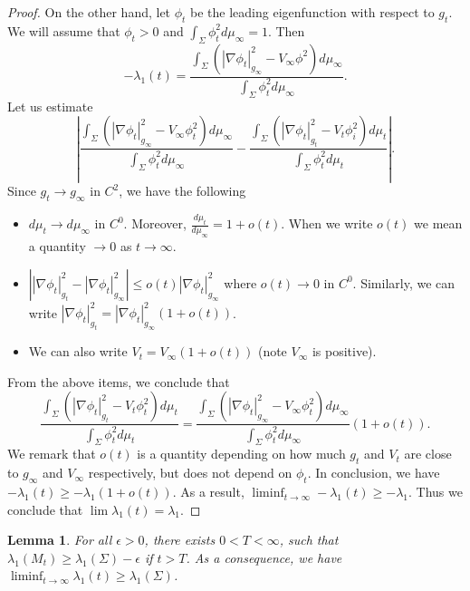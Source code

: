 \documentclass[12pt]{amsart}
\numberwithin{equation}{section}
\newtheorem{lemma}[theorem]{Lemma}
\numberwithin{equation}{section}
\begin{document}
\begin{proof}
		On the other hand, let $\phi_t$ be the leading eigenfunction with respect to $g_t$. We will assume that $\phi_t>0$ and $\int_\Sigma \phi_t^2 d\mu_\infty=1$. Then
		\begin{equation*}
			-\lambda_1(t)=\frac{\int_\Sigma (|\nabla \phi_t|_{g_\infty}^2-V_\infty \phi^2 )d\mu_\infty }{\int_\Sigma \phi_t^2 d\mu_\infty}.
		\end{equation*} 
		Let us estimate 
		\begin{equation*}
			\left|\frac{\int_\Sigma (|\nabla \phi_t|_{g_\infty}^2-V_\infty \phi_t^2) d\mu_\infty }{\int_\Sigma \phi_t^2 d\mu_\infty}-\frac{\int_\Sigma (|\nabla \phi_t|_{g_t}^2-V_t \phi_i^2 )d\mu_t }{\int_\Sigma \phi_t^2 d\mu_t}\right|.
		\end{equation*}
		Since $g_t\to g_\infty$ in $C^2$, we have the following
		\begin{itemize}
			\item $d\mu_t\to d\mu_\infty$ in $C^0$. Moreover, $\frac{d\mu_t}{d\mu_\infty}=1+o(t)$. When we write $o(t)$ we mean a quantity $\to 0$ as $t\to\infty$.
			\item $\left||\nabla \phi_t|_{g_t}^2-|\nabla \phi_t|_{g_\infty}^2\right|\leq o(t)|\nabla \phi_t|^2_{g_\infty}$ where $o(t)\to 0$ in $C^0$. Similarly, we can write $|\nabla \phi_t|_{g_t}^2= |\nabla \phi_t|_{g_\infty}^2(1+o(t))$.
			\item We can also write $V_t=V_\infty(1+o(t))$ (note $V_\infty$ is positive).
		\end{itemize}
		From the above items, we conclude that
		\begin{equation*}
			\frac{\int_\Sigma (|\nabla \phi_t|_{g_t}^2-V_t \phi_t^2 )d\mu_t }{\int_\Sigma \phi_t^2 d\mu_t}
			=
			\frac{\int_\Sigma (|\nabla \phi_t|_{g_\infty}^2-V_\infty \phi_t^2 )d\mu_\infty }{\int_\Sigma \phi_t^2 d\mu_\infty}(1+o(t)).
		\end{equation*}
		We remark that $o(t)$ is a quantity depending on how much $g_t$ and $V_t$ are close to $g_\infty$ and $V_\infty$ respectively, but does not depend on $\phi_t$. In conclusion, we have
		$
		-\lambda_1(t) \geq -\lambda_1(1+o(t)).
		$
		As a result, $	\liminf_{t\to\infty} -\lambda_1(t)\geq -\lambda_1.$
		Thus we conclude that $\lim\lambda_1(t)=\lambda_1$.
	\end{proof}
	
	\begin{lemma}\label{lem:eigenconverge-1}
		For all $\epsilon>0$, there exists $0<T<\infty$, such that $\lambda_1(M_t)\geq\lambda_1(\Sigma)-\epsilon$ if $t>T$. As a consequence, we have
		$\liminf_{t\to\infty}\lambda_1(t)\geq \lambda_1(\Sigma)$.
	\end{lemma}
	
\end{document}
